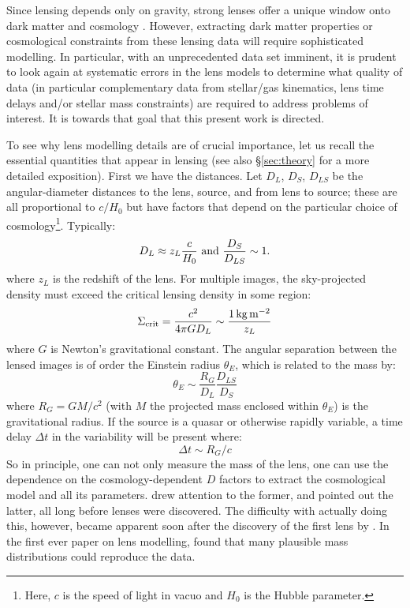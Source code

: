 \documentclass[galley,usenatbib]{mn2e}
\begin{document}
Since lensing depends only on gravity, strong lenses offer a unique window onto
dark matter and cosmology \citep{2010CQGra..27w3001B,2012arXiv1206.1225A}.
However, extracting dark matter properties or cosmological constraints from
these lensing data will require sophisticated modelling. In particular, with an
unprecedented data set imminent, it is prudent to look again at systematic
errors in the lens models to determine what quality of data (in particular
complementary data from stellar/gas kinematics, lens time delays and/or stellar
mass constraints) are required to address problems of interest. It is towards
that goal that this present work is directed.

To see why lens modelling details are of crucial importance, let us
recall the essential quantities that appear in lensing (see also \S\ref{sec:theory} for a more detailed exposition). First we have the distances. Let $D_L$, $D_S$, $D_{LS}$ be the
angular-diameter distances to the lens, source, and from lens to
source; these are all proportional to $c/H_0$ but have factors
that depend on the particular choice of cosmology\footnote{Here, $c$ is the speed of light in vacuo and $H_0$ is the Hubble parameter.}.  Typically:
%
\begin{equation}
D_L \approx z_L \frac c{H_0}\ \hbox{and}\ \frac{D_S}{D_{LS}} \sim 1.
\end{equation}
where $z_L$ is the redshift of the lens. 
%
For multiple images, the sky-projected density must exceed the critical lensing density in some region:
%
\begin{equation}
\Sigma_\mathrm{crit} = \frac{c^2}{4\pi G D_L} \sim \frac{1\rm\,kg\,m^{-2}}{z_L}
\end{equation}
where $G$ is Newton's gravitational constant. 
%
The angular separation between the lensed images is of order
the Einstein radius $\theta_E$, which is related to
the mass by:
%
\begin{equation}
\theta_E \sim \frac{R_G}{D_L} \frac{D_{LS}}{D_S}
\end{equation}
%
where $R_G = GM/c^2$ (with $M$ the projected mass enclosed within $\theta_E$)
is the gravitational radius. If the source is a quasar or otherwise rapidly
variable, a time delay $\Delta t$ in the variability will be present where:
%
\begin{equation}
\Delta t \sim R_G/c
\end{equation}
%
So in principle, one can not only measure the mass of the lens, one can use the
dependence on the cosmology-dependent $D$ factors to extract the cosmological
model and all its parameters.  \cite{1937ApJ....86..217Z} drew attention to the
former, and \cite{1964MNRAS.128..307R,1966MNRAS.132..101R} pointed out the
latter, all long before lenses were discovered.  The difficulty with actually
doing this, however, became apparent soon after the discovery of the first lens
by \cite{1979Natur.279..381W}.  In the first ever paper on lens modelling,
\cite{1981ApJ...244..736Y} found that many plausible mass distributions could
reproduce the data.
\end{document}
